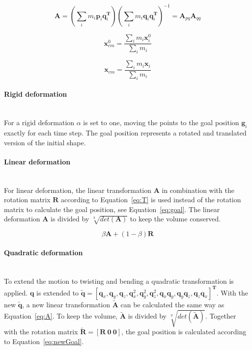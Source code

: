     \begin{equation} \label{eq:A}
        \mathbf{A} = (\sum_i{m_i\mathbf{p}_i\mathbf{q}_i^{\mathbf{T}}})
        (\sum_i{m_i\mathbf{q}_i\mathbf{q}_i^{\mathbf{T}}})^{-1} 
        = \mathbf{A}_{pq}\mathbf{A}_{qq}
    \end{equation}

    \begin{equation} \label{eq:com1}
        \mathbf{x}^0_{cm} = \frac{\sum_i{m_i\mathbf{x}_i^0}}{\sum_i{m_i}}
    \end{equation}

    \begin{equation} \label{eq:com2}
        \mathbf{x}_{cm} = \frac{\sum_i{m_i\mathbf{x}_i}}{\sum_i{m_i}}
    \end{equation}

    \paragraph{Rigid deformation}\mbox{}\\[5px]
    For a rigid deformation $\alpha$ is set to one, moving the points to the goal position $\mathbf{g}_i$ exactly for each time step.
    The goal position represents a rotated and translated version of the initial shape.

    \paragraph{Linear deformation}\mbox{}\\[5px]
    For linear deformation, the linear transformation $\mathbf{A}$ in combination with the rotation matrix $\mathbf{R}$ according to Equation~\ref{eq:T} is used instead of the rotation matrix to calculate the goal position, see Equation~\ref{eq:goal}.
    The linear deformation $\mathbf{A}$ is divided by $\sqrt[3]{det(\mathbf{A})}$ to keep the volume conserved.

    \begin{equation} \label{eq:T}
        \beta\mathbf{A} + (1 - \beta)\mathbf{R}
    \end{equation}

    \paragraph{Quadratic deformation}\mbox{}\\[5px]
    To extend the motion to twisting and bending a quadratic transformation is applied.
    $\mathbf{q}$ is extended to $\mathbf{\tilde{q}} = [\mathbf{q}_x, \mathbf{q}_y, \mathbf{q}_z, \mathbf{q}_x^2, \mathbf{q}_y^2, \mathbf{q}_z^2, \mathbf{q}_x\mathbf{q}_y, \mathbf{q}_y\mathbf{q}_z, \mathbf{q}_z\mathbf{q}_x]^\mathbf{T}$.
    With the new $\mathbf{\tilde{q}}$, a new linear transformation $\mathbf{\tilde{A}}$ can be calculated the same way as Equation~\ref{eq:A}.
    To keep the volume, $\mathbf{\tilde{A}}$ is divided by $\sqrt[9]{det(\mathbf{\tilde{A}})}$.
    Together with the rotation matrix $\mathbf{\tilde{R}} = [\mathbf{R~0~0}]$, the goal position is calculated according to Equation~\ref{eq:newGoal}.

